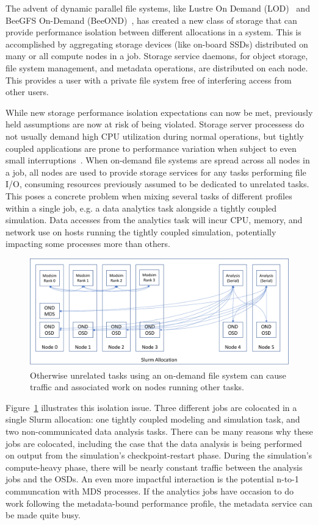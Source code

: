 The advent of dynamic parallel file systems, like Lustre On Demand (LOD)~\cite{lod} and BeeGFS On-Demand (BeeOND)~\cite{beeond}, has created a new class of storage that can provide performance isolation between different allocations in a system. This is accomplished by aggregating storage devices (like on-board SSDs) distributed on many or all compute nodes in a job. Storage service daemons, for object storage, file system management, and metadata operations, are distributed on each node. This provides a user with a private file system free of interfering access from other users.

While new storage performance isolation expectations can now be met, previously held assumptions are now at risk of being violated. Storage server processess do not usually demand high CPU utilization during normal operations, but tightly coupled applications are prone to performance variation when subject to even small interruptions~\cite{jitter}. When on-demand file systems are spread across all nodes in a job, all nodes are used to provide storage services for any tasks performing file I/O, consuming resources previously assumed to be dedicated to unrelated tasks. This poses a concrete problem when mixing several tasks of different profiles within a single job, e.g. a data analytics task alongside a tightly coupled simulation. Data accesses from the analytics task will incur CPU, memory, and network use on hosts running the tightly coupled simulation, potentially impacting some processes more than others.

\begin{figure}[htbp]
\centerline{\includegraphics[width=\columnwidth]{network-comms.pdf}}
\caption{Otherwise unrelated tasks using an on-demand file system can cause traffic and associated work on nodes running other tasks.} \label{Fig:network}
\end{figure}

Figure~\ref{Fig:network} illustrates this isolation issue. Three different jobs are colocated in a single Slurm allocation: one tightly coupled modeling and simulation task, and two non-communicated data analysis tasks. There can be many reasons why these jobs are colocated, including the case that the data analysis is being performed on output from the simulation's checkpoint-restart phase. During the simulation's compute-heavy phase, there will be nearly constant traffic between the analysis jobs and the OSDs. An even more impactful interaction is the potential n-to-1 communcation with MDS processes. If the analytics jobs have occasion to do work following the metadata-bound performance profile, the metadata service can be made quite busy.

